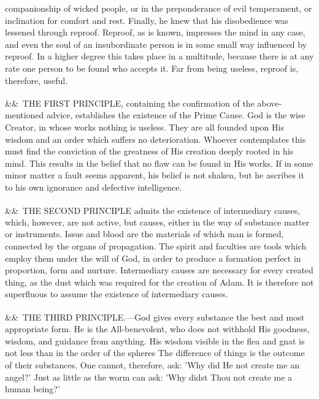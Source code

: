 \documentclass[12pt]{article}
\newcommand{\para}[1][]{\par\noindent\ifx&#1&\else\textsuperscript{\footnotesize #1}~\fi}
\begin{document}
companionship of wicked people, or in the preponderance of evil temperament, or inclination for comfort and rest. Finally, he knew that his disobedience was lessened through reproof. Reproof, as is known, impresses the mind in any case, and even the soul of an insubordinate person is in some small way influenced by reproof. In a higher degree this takes place in a multitude, because there is at any rate one person to be found who accepts it. Far from being useless, reproof is, therefore, useful.

\para THE FIRST PRINCIPLE, containing the confirmation of the above-mentioned advice, establishes the existence of the Prime Cause. God is the wise Creator, in whose works nothing is useless. They are all founded upon His wisdom and an order which suffers no deterioration. Whoever contemplates this must find the conviction of the greatness of His creation deeply rooted in his mind. This results in the belief that no flaw can be found in His works. If in some minor matter a fault seems apparent, his belief is not shaken, but he ascribes it to his own ignorance and defective intelligence.

\para THE SECOND PRINCIPLE admits the existence of intermediary causes, which, however, are not active, but causes, either in the way of substance matter or instruments. Issue and blood are the materials of which man is formed, connected by the organs of propagation. The spirit and faculties are tools which employ them under the will of God, in order to produce a formation perfect in proportion, form and nurture. Intermediary causes are necessary for every created thing, as the dust which was required for the creation of Adam. It is therefore not superfluous to assume the existence of intermediary causes.

\para THE THIRD PRINCIPLE.---God gives every substance the best and most appropriate form. He is the All-benevolent, who does not withhold His goodness, wisdom, and guidance from anything. His wisdom visible in the flea and gnat is not less than in the order of the spheres The difference of things is the outcome of their substances. One cannot, therefore, ask: 'Why did He not create me an angel?' Just as little as the worm can ask: 'Why didst Thou not create me a human being?'
\end{document}
